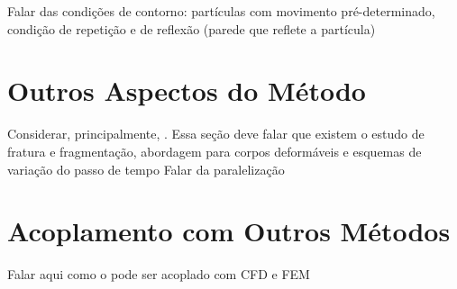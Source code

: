 \alert{Falar das condições de contorno: partículas com movimento pré-determinado, condição de repetição e de reflexão (parede que reflete a partícula)}

\section{Outros Aspectos do Método}
\alert{Considerar, principalmente, . Essa seção deve falar que existem o estudo de fratura e fragmentação, abordagem para corpos deformáveis e esquemas de variação do passo de tempo}
\alert{Falar da paralelização}

\section{Acoplamento com Outros Métodos}
\alert{Falar aqui como o \DEM{} pode ser acoplado com CFD e FEM}